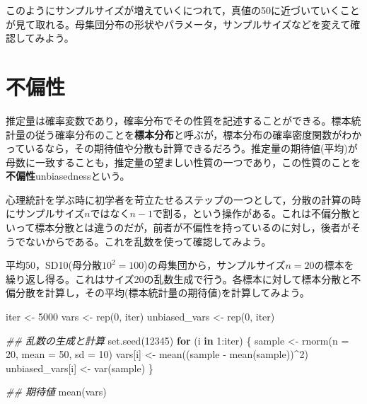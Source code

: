 \documentclass[
  a4paper,
]{ltjsbook}
\newenvironment{Shaded}{\begin{snugshade}}{\end{snugshade}}
\newcommand{\AttributeTok}[1]{\textcolor[rgb]{0.40,0.45,0.13}{#1}}
\newcommand{\ControlFlowTok}[1]{\textcolor[rgb]{0.00,0.23,0.31}{\textbf{#1}}}
\newcommand{\DecValTok}[1]{\textcolor[rgb]{0.68,0.00,0.00}{#1}}
\newcommand{\DocumentationTok}[1]{\textcolor[rgb]{0.37,0.37,0.37}{\textit{#1}}}
\newcommand{\FunctionTok}[1]{\textcolor[rgb]{0.28,0.35,0.67}{#1}}
\newcommand{\NormalTok}[1]{\textcolor[rgb]{0.00,0.23,0.31}{#1}}
\newcommand{\OtherTok}[1]{\textcolor[rgb]{0.00,0.23,0.31}{#1}}
\newcommand{\SpecialCharTok}[1]{\textcolor[rgb]{0.37,0.37,0.37}{#1}}
\begin{document}
このようにサンプルサイズが増えていくにつれて，真値の50に近づいていくことが見て取れる。母集団分布の形状やパラメータ，サンプルサイズなどを変えて確認してみよう。

\section{不偏性}\label{ux4e0dux504fux6027}

推定量は確率変数であり，確率分布でその性質を記述することができる。標本統計量の従う確率分布のことを\textbf{標本分布}と呼ぶが，標本分布の確率密度関数がわかっているなら，その期待値や分散も計算できるだろう。推定量の期待値(平均)が母数に一致することも，推定量の望ましい性質の一つであり，この性質のことを\textbf{不偏性}unbiasednessという。

心理統計を学ぶ時に初学者を苛立たせるステップの一つとして，分散の計算の時にサンプルサイズ\(n\)ではなく\(n-1\)で割る，という操作がある。これは不偏分散といって標本分散とは違うのだが，前者が不偏性を持っているのに対し，後者がそうでないからである。これを乱数を使って確認してみよう。

平均50，SD10(母分散\(10^2=100\))の母集団から，サンプルサイズ\(n=20\)の標本を繰り返し得る。これはサイズ20の乱数生成で行う。各標本に対して標本分散と不偏分散を計算し，その平均(標本統計量の期待値)を計算してみよう。

\begin{Shaded}
\begin{Highlighting}[]
\NormalTok{iter }\OtherTok{\textless{}{-}} \DecValTok{5000}
\NormalTok{vars }\OtherTok{\textless{}{-}} \FunctionTok{rep}\NormalTok{(}\DecValTok{0}\NormalTok{, iter)}
\NormalTok{unbiased\_vars }\OtherTok{\textless{}{-}} \FunctionTok{rep}\NormalTok{(}\DecValTok{0}\NormalTok{, iter)}

\DocumentationTok{\#\# 乱数の生成と計算}
\FunctionTok{set.seed}\NormalTok{(}\DecValTok{12345}\NormalTok{)}
\ControlFlowTok{for}\NormalTok{ (i }\ControlFlowTok{in} \DecValTok{1}\SpecialCharTok{:}\NormalTok{iter) \{}
\NormalTok{  sample }\OtherTok{\textless{}{-}} \FunctionTok{rnorm}\NormalTok{(}\AttributeTok{n =} \DecValTok{20}\NormalTok{, }\AttributeTok{mean =} \DecValTok{50}\NormalTok{, }\AttributeTok{sd =} \DecValTok{10}\NormalTok{)}
\NormalTok{  vars[i] }\OtherTok{\textless{}{-}} \FunctionTok{mean}\NormalTok{((sample }\SpecialCharTok{{-}} \FunctionTok{mean}\NormalTok{(sample))}\SpecialCharTok{\^{}}\DecValTok{2}\NormalTok{)}
\NormalTok{  unbiased\_vars[i] }\OtherTok{\textless{}{-}} \FunctionTok{var}\NormalTok{(sample)}
\NormalTok{\}}

\DocumentationTok{\#\# 期待値}
\FunctionTok{mean}\NormalTok{(vars)}
\end{Highlighting}
\end{Shaded}
\end{document}
